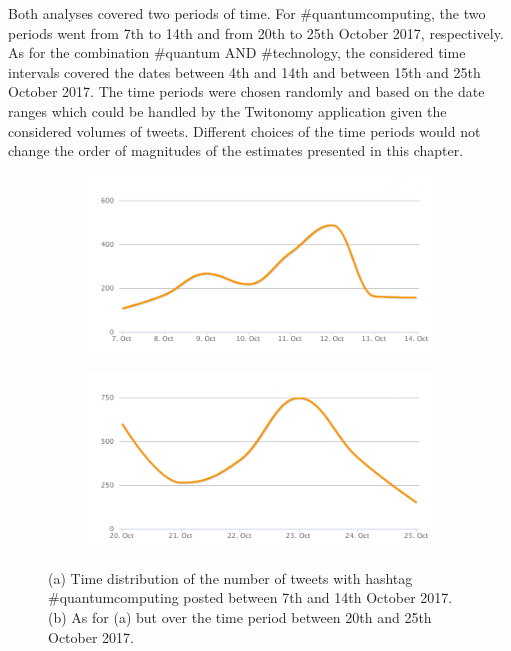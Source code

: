 Both analyses covered two periods of time. For \#quantumcomputing, the two periods went from 7th to 14th and from 20th to 25th October 2017, respectively. As for the combination \#quantum AND \#technology, the considered time intervals covered the dates between 4th and 14th and between 15th and 25th October 2017. The time periods were chosen randomly and based on the date ranges which could be handled by the Twitonomy application given the considered volumes of tweets. Different choices of the time periods would not change the order of magnitudes of the estimates presented in this chapter.  

\begin{figure}
 \centering
 \begin{subfigure}[t]{0.9\textwidth}
   \includegraphics[width=1\linewidth]{Images/FirstSearch_QuantumComputing.png}
   \caption{} 
 \end{subfigure}

 \begin{subfigure}[t]{0.9\textwidth}
   \includegraphics[width=1\linewidth]{Images/SecondSearch_QuantumComputing.png}
   \caption{}
 \end{subfigure}
 \caption{(a) Time distribution of the number of tweets with hashtag \#quantumcomputing posted between 7th and 14th October 2017. (b) As for (a) but over the time period between 20th and 25th October 2017.} 
 \label{First-SecondSearch_QuantumComputing}
\end{figure}

